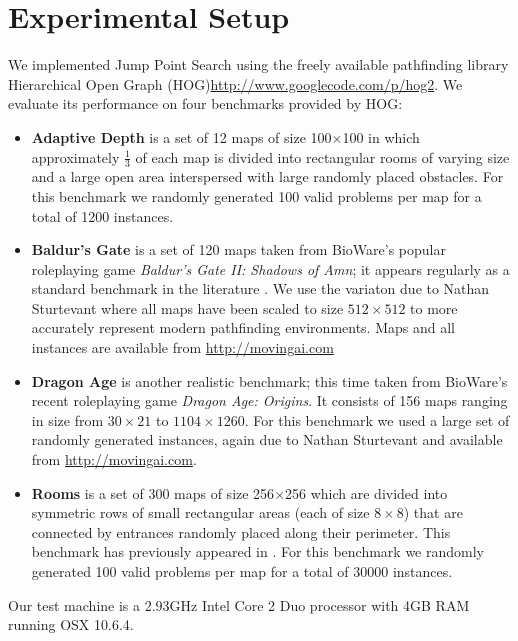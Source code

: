 \section{Experimental Setup}
\label{cha::jps::setup}
We implemented Jump Point Search using the freely available pathfinding library
Hierarchical Open Graph (HOG)\url{http://www.googlecode.com/p/hog2}. We 
evaluate its performance on four benchmarks provided by HOG:
\begin{itemize}

\item{\textbf{Adaptive Depth}
is a set of 12 maps of size 100$\times$100 in which approximately $\frac{1}{3}$
of each map is divided into rectangular rooms of varying size and a large
open area interspersed with large randomly placed obstacles.
For this benchmark we randomly generated 100 valid problems per map for a 
total of 1200 instances.
} 

\item{\textbf{Baldur's Gate} is a set of 120 maps taken from BioWare's popular
roleplaying game \emph{Baldur's Gate II: Shadows of Amn}; it 
appears regularly as a standard benchmark in the literature
\cite{bjornsson06,harabor10,pochter10}.
We use the variaton due to Nathan Sturtevant where all maps have been scaled to size
$512\times512$ to more accurately represent modern pathfinding environments.
Maps and all instances are available from \url{http://movingai.com}
}

\item{\textbf{Dragon Age} is another realistic benchmark; this time taken from
BioWare's recent roleplaying game \emph{Dragon Age: Origins}.
It consists of 156 maps ranging in size 
from $30\times21$ to $1104\times1260$.
For this benchmark we used a large set of randomly generated instances,
again due to Nathan Sturtevant and available from \url{http://movingai.com}.
}

\item{\textbf{Rooms} is a set of 300 maps of size
256$\times$256 which are divided into symmetric rows of small 
rectangular areas (each of size $8\times8$) that are connected by entrances
randomly placed along their perimeter. This benchmark has
previously appeared in \cite{pochter10}.
For this benchmark we randomly generated 100 valid problems per map for a 
total of 30000 instances.
}
\end{itemize}

Our test machine is a 2.93GHz Intel Core 2 Duo processor with 4GB RAM running OSX 
10.6.4.  
